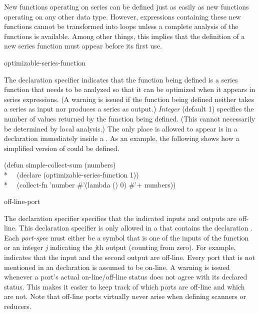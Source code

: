 New functions operating on series can be defined just as easily as new
functions operating on any other data type.  However, expressions
containing these new functions cannot be transformed into loops unless a
complete analysis of the functions is available.  Among other things,
this implies that the definition of a new series function must appear
before its first use.


\begin{defun}
optimizable-series-function

The declaration specifier  indicates
that the function being defined is a series function that needs to be
analyzed so that it can be optimized when it appears in series expressions.
(A warning is issued if the function being defined neither takes a series
as input nor produces a series as output.)  \emph{Integer} (default 1)
specifies the number of values returned by the function being defined.
(This cannot necessarily be determined by local analysis.)  The only place
 is allowed to appear is in a declaration
immediately inside a .  As an example, the following shows how a
simplified version of  could be defined.
\begin{lisp}
(defun simple-collect-sum (numbers) \\*
~~(declare (optimizable-series-function 1)) \\*
~~(collect-fn 'number \#'(lambda () 0) \#'+ numbers))
\end{lisp}
\end{defun}

\begin{defun}
off-line-port

The declaration specifier
 specifies that the
indicated inputs and outputs are off-line.  This declaration
specifier is only allowed in a  that contains the declaration 
.  Each \emph{port-spec} must either be a symbol
that is one of the inputs of the function or an integer \emph{j} indicating the
\emph{j\/}th output (counting from zero).  For example, 
indicates that the input  and the second output are off-line.
Every port that is not mentioned in an 
declaration is assumed to be on-line.  A warning is issued whenever a
port's actual on-line/off-line status does not agree with its declared
status.  This makes it easier to keep track of which ports are off-line and
which are not.  Note that off-line ports virtually never arise when
defining scanners or reducers.
\end{defun}

